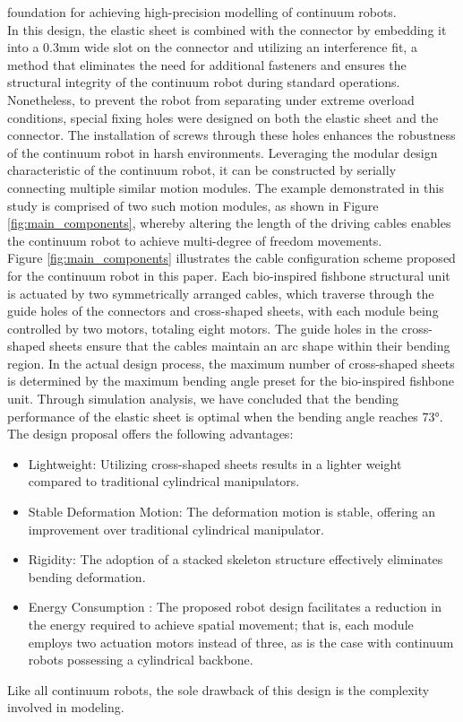 foundation for achieving high-precision modelling of continuum robots. \\
In this design, the elastic sheet is combined with the connector by embedding it into a 0.3mm wide slot on the connector 
and utilizing an interference fit, a method that eliminates the need for additional fasteners and ensures the structural 
integrity of the continuum robot during standard operations. Nonetheless, to prevent the robot from separating under 
extreme overload conditions, special fixing holes were designed on both the elastic sheet and the connector. The 
installation of screws through these holes enhances the robustness of the continuum robot in harsh environments. 
Leveraging the modular design characteristic of the continuum robot, it can be constructed by serially connecting 
multiple similar motion modules. The example demonstrated in this study is comprised of two such motion modules, as 
shown in Figure \ref{fig:main_components}, whereby altering the length of the driving cables enables the continuum 
robot to achieve multi-degree of freedom movements. \\
Figure \ref{fig:main_components} illustrates the cable configuration scheme proposed for the continuum robot in this 
paper. Each bio-inspired fishbone structural unit is actuated by two symmetrically arranged cables, which traverse 
through the guide holes of the connectors and cross-shaped sheets, with each module being controlled by two motors, 
totaling eight motors. The guide holes in the cross-shaped sheets ensure that the cables maintain an arc shape within 
their bending region. In the actual design process, the maximum number of cross-shaped sheets is determined by the 
maximum bending angle preset for the bio-inspired fishbone unit. Through simulation analysis, we have concluded that 
the bending performance of the elastic sheet is optimal when the bending angle reaches 73°. \\
The design proposal offers the following advantages: \\
\begin{itemize}
    \item Lightweight: Utilizing cross-shaped sheets results in a lighter weight compared to traditional cylindrical manipulators.
    \item Stable Deformation Motion: The deformation motion is stable, offering an improvement over traditional cylindrical manipulator.
    \item Rigidity: The adoption of a stacked skeleton structure effectively eliminates bending deformation.
    \item Energy Consumption \cite{bio_noval_method}: The proposed robot design facilitates a reduction in the energy required to achieve spatial movement; that is, each module employs two actuation motors instead of three, as is the case with continuum robots possessing a cylindrical backbone.
\end{itemize}
Like all continuum robots, the sole drawback of this design is the complexity involved in modeling.

